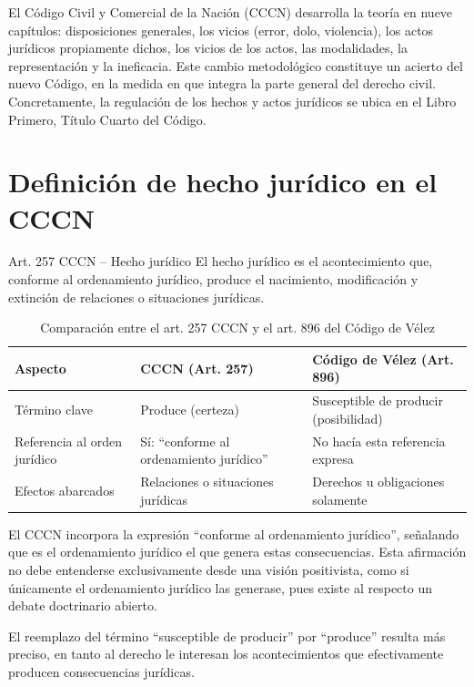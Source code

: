 \documentclass[12pt,oneside]{book}
\begin{document}
El Código Civil y Comercial de la Nación (CCCN) desarrolla la teoría en nueve capítulos: disposiciones generales, los vicios (error, dolo, violencia), los actos jurídicos propiamente dichos, los vicios de los actos, las modalidades, la representación y la ineficacia. Este cambio metodológico constituye un acierto del nuevo Código, en la medida en que integra la parte general del derecho civil. Concretamente, la regulación de los hechos y actos jurídicos se ubica en el Libro Primero, Título Cuarto del Código.

\section{Definición de hecho jurídico en el CCCN}

\begin{definition}{Art. 257 CCCN -- Hecho jurídico}
El hecho jurídico es el acontecimiento que, conforme al ordenamiento jurídico, produce el nacimiento, modificación y extinción de relaciones o situaciones jurídicas.
\end{definition}

\begin{table}[H]
\centering
\caption{Comparación entre el art. 257 CCCN y el art. 896 del Código de Vélez}
\begin{tabularx}{\textwidth}{l X X}
\toprule
\textbf{Aspecto} & \textbf{CCCN (Art. 257)} & \textbf{Código de Vélez (Art. 896)} \\
\midrule
Término clave & Produce (certeza) & Susceptible de producir (posibilidad) \\
Referencia al orden jurídico & Sí: ``conforme al ordenamiento jurídico'' & No hacía esta referencia expresa \\
Efectos abarcados & Relaciones o situaciones jurídicas & Derechos u obligaciones solamente \\
\bottomrule
\end{tabularx}
\end{table}

El CCCN incorpora la expresión ``conforme al ordenamiento jurídico'', señalando que es el ordenamiento jurídico el que genera estas consecuencias. Esta afirmación no debe entenderse exclusivamente desde una visión positivista, como si únicamente el ordenamiento jurídico las generase, pues existe al respecto un debate doctrinario abierto.

El reemplazo del término ``susceptible de producir'' por ``produce'' resulta más preciso, en tanto al derecho le interesan los acontecimientos que efectivamente producen consecuencias jurídicas.
\end{document}
